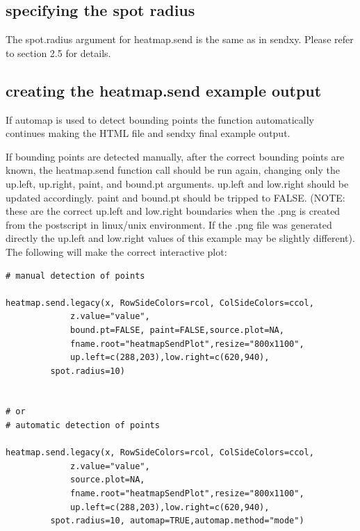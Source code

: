 \documentclass[]{article}
\begin{document}
\subsection{specifying the spot radius}

\indent The spot.radius argument for heatmap.send is the same as in sendxy. Please refer to section 2.5 for details. 

\subsection{creating the heatmap.send example output}

\indent If automap is used to detect bounding points the function automatically continues making the HTML file and sendxy final example output. 

\indent If bounding points are detected manually, after the correct bounding points are known, the heatmap.send function call should be run again, changing only the up.left, up.right, paint, and bound.pt arguments. up.left and low.right should be updated accordingly. paint and bound.pt should be tripped to FALSE. (NOTE: these are the correct up.left and low.right boundaries when the .png is created from the postscript in linux/unix environment. If the .png file was generated directly the up.left and low.right values of this example may be slightly different).  The following will make the correct interactive plot:
\begin{verbatim}
# manual detection of points

heatmap.send.legacy(x, RowSideColors=rcol, ColSideColors=ccol,
             z.value="value",
             bound.pt=FALSE, paint=FALSE,source.plot=NA,
             fname.root="heatmapSendPlot",resize="800x1100",
             up.left=c(288,203),low.right=c(620,940),
	     spot.radius=10)


# or 
# automatic detection of points

heatmap.send.legacy(x, RowSideColors=rcol, ColSideColors=ccol,
             z.value="value",
             source.plot=NA,
             fname.root="heatmapSendPlot",resize="800x1100",
             up.left=c(288,203),low.right=c(620,940),
	     spot.radius=10, automap=TRUE,automap.method="mode")

\end{verbatim}
\end{document}
